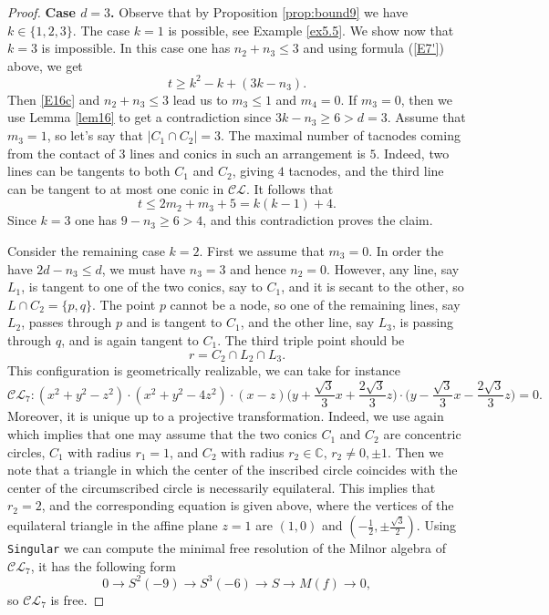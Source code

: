 \documentclass[12pt]{amsart}
\theoremstyle{plain}
\theoremstyle{definition}
\numberwithin{equation}{section}
\newcommand{\C}{\mathbb{C}}
\begin{document}
\begin{proof}
{\bf Case $d=3$.} Observe that by Proposition \ref{prop:bound9} we have $k \in \{1,2,3\}$. The case $k=1$ is possible, see Example \ref{ex5.5}.
 We show now that  $k = 3$ is impossible. In this case one has
$n_2+n_3\leq 3$ and using formula (\ref{E7'}) above, we get
\begin{equation}
\label{E16d}
t \geq k^2-k+(3k-n_3).
\end{equation}
Then \eqref{E16c} and $n_{2} + n_{3} \leq 3$ lead us to $m_3\leq 1$ and $m_4=0$. If $m_3=0$, then we use Lemma \ref{lem16} to get a contradiction since
$3k-n_3 \geq 6 > d=3$. Assume that $m_3=1$, so let's say that $|C_1 \cap C_2|=3$. The maximal number of tacnodes coming from the contact of $3$ lines and conics in such an arrangement is $5$. Indeed, two lines can be tangents to both $C_1$ and $C_2$, giving $4$ tacnodes, and the third line can be tangent to at most one conic in $\mathcal{CL}$.
It follows that
$$t \leq 2m_2+m_3+5=k(k-1)+4.$$
Since $k = 3$ one has $9 - n_3\geq 6 > 4$, and this contradiction proves the claim.

Consider the remaining case $k=2$. First we assume that $m_3=0$. In order the have
$2d-n_3 \leq d$, we must have $n_3=3$ and hence $n_2=0$. However, any line, say $L_1$, is tangent to one of the two conics, say to $C_1$, and it is secant to the other, so $L \cap C_2=\{p,q\}$. The point $p$ cannot be a node, so one of the remaining lines, say $L_2$, passes through $p$ and is tangent to $C_1$, and the other line, say $L_3$, is passing through $q$, and is again tangent to $C_1$. The third triple point should be
$$r= C_2 \cap L_2 \cap L_3.$$
This configuration is geometrically realizable, we can take for instance
$$\mathcal{CL}_{7}: (x^2+y^2-z^2)\cdot(x^2+y^2-4z^2)\cdot(x-z)\bigg(y + \frac{\sqrt{3}}{3}x + \frac{2\sqrt{3}}{3}z\bigg)\cdot\bigg(y - \frac{\sqrt{3}}{3}x - \frac{2\sqrt{3}}{3}z\bigg)=0.$$
Moreover, it is unique up to a projective transformation. Indeed, we use again \cite[Proposition 3]{Meg} which implies that one may assume that the two conics $C_1$ and $C_2$ are concentric circles, $C_1$  with radius $r_1=1$, and $C_2$  with radius $r_2 \in \C$, $r_2 \ne 0, \pm 1$.
Then we note that  a triangle in which the center of the inscribed circle coincides with the center of the circumscribed circle is necessarily equilateral. This implies that $r_2=2$, and the corresponding equation is given above, where the vertices of the equilateral triangle in the affine plane $z=1$ are $(1,0)$ and $(- \frac{1}{2}, \pm \frac{\sqrt 3}{2})$.
Using \verb{Singular{ we can compute the minimal free resolution of the Milnor algebra of $\mathcal{CL}_{7}$, it has the following form
$$0 \rightarrow S^{2}(-9) \rightarrow S^{3}(-6) \rightarrow S \rightarrow M(f) \rightarrow 0,$$
so $\mathcal{CL}_{7}$ is free.


\end{proof}
\end{document}
